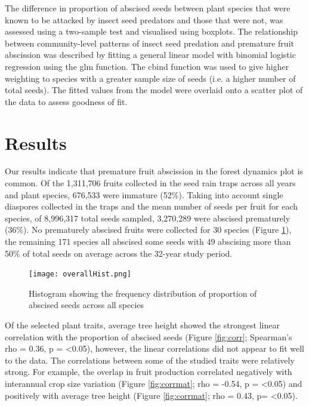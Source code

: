 The difference in proportion of abscised seeds between plant species that were known to be attacked by insect seed predators and those that were not, was assessed using a two-sample test and visualised using boxplots. The relationship between community-level patterns of insect seed predation and premature fruit abscission was described by fitting a general linear model with binomial logistic regression using the glm function. The cbind function was used to give higher weighting to species with a greater sample size of seeds (i.e. a higher number of total seeds). The fitted values from the model were overlaid onto a scatter plot of the data to assess goodness of fit.\\

\section{Results}
Our results indicate that premature fruit abscission in the forest dynamics plot is common. Of the 1,311,706 fruits collected in the seed rain traps across all years and plant species, 676,533 were immature (52\%). Taking into account single diaspores collected in the traps and the mean number of seeds per fruit for each species, of 8,996,317 total seeds sampled, 3,270,289 were abscised prematurely (36\%). No prematurely abscised fruits were collected for 30 species (Figure \ref{fig:hist}), the remaining 171 species all abscised some seeds with 49 abscising more than 50\% of total seeds on average across the 32-year study period.\\

\begin{figure}[!h]
\centering
\texttt{[image: overallHist.png]}
\caption{Histogram showing the frequency distribution of proportion of abscised seeds across all species}
\label{fig:hist}
\end{figure}

Of the selected plant traits, average tree height showed the strongest linear correlation with the proportion of abscised seeds (Figure \ref{fig:corr}; Spearman’s rho = 0.36, p = \textless 0.05), however, the linear correlations did not appear to fit well to the data. The correlations between some of the studied traits were relatively strong. For example, the overlap in fruit production correlated negatively with interannual crop size variation (Figure \ref{fig:corrmat}; rho = -0.54, p = \textless 0.05) and positively with average tree height (Figure \ref{fig:corrmat}; rho = 0.43, p= \textless 0.05).\\

